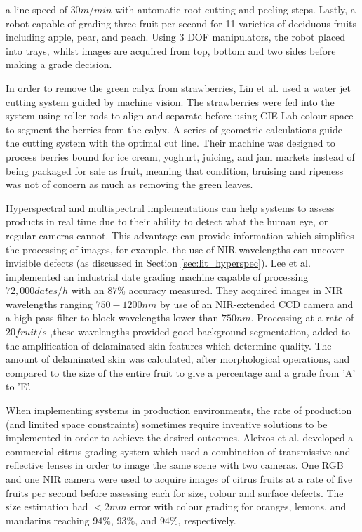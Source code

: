 \documentclass[fleqn,twoside,12pt]{report}
\begin{document}
a line speed of $30m/min$ with automatic root cutting and peeling steps. Lastly, a robot capable of grading three fruit per second for 11 varieties of deciduous fruits including apple, pear, and peach. Using 3 DOF manipulators, the robot placed into trays, whilst images are acquired from top, bottom and two sides before making a grade decision. 


In order to remove the green calyx from strawberries, Lin et al.\cite{lin} used a water jet cutting system guided by machine vision. The strawberries were fed into the system using roller rods to align and separate before using CIE-Lab colour space to segment the berries from the calyx. A series of geometric calculations guide the cutting system with the optimal cut line. Their machine was designed to process berries bound for ice cream, yoghurt, juicing, and jam markets instead of being packaged for sale as fruit, meaning that condition, bruising and ripeness was not of concern as much as removing the green leaves.

Hyperspectral and multispectral implementations can help systems to assess products in real time due to their ability to detect what the human eye, or regular cameras cannot. This advantage can provide information which simplifies the processing of images, for example, the use of NIR wavelengths can uncover invisible defects (as discussed in Section \ref{sec:lit_hyperspec}). Lee et al.\cite{lee} implemented an industrial date grading machine capable of processing $72,000 dates/h$ with an $87\%$ accuracy measured. They acquired images in NIR wavelengths ranging $750-1200nm$ by use of an NIR-extended CCD camera and a high pass filter to block wavelengths lower than $750nm$. Processing at a rate of $20 fruit/s$ ,these wavelengths provided good background segmentation, added to the amplification of delaminated skin features which determine quality. The amount of delaminated skin was calculated, after morphological operations, and compared to the size of the entire fruit to give a percentage and a grade from 'A' to 'E'. 

When implementing systems in production environments, the rate of production (and limited space constraints) sometimes require inventive solutions to be implemented in order to achieve the desired outcomes. Aleixos et al.\cite{aleixos} developed a commercial citrus grading system which used a combination of transmissive and reflective lenses in order to image the same scene with two cameras. One RGB and one NIR camera were used to acquire images of citrus fruits at a rate of five fruits per second before assessing each for size, colour and surface defects. The size estimation had $<2mm$ error with colour grading for oranges, lemons, and mandarins reaching $94\%$, $93\%$, and $94\%$, respectively.
\end{document}
